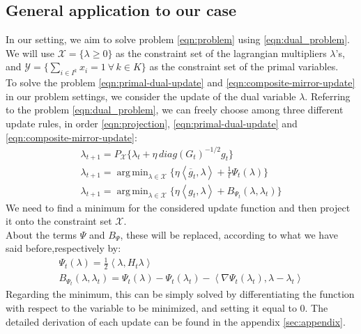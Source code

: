 \documentclass[notitlepage]{article}
\DeclareMathOperator*{\argmin}{arg\,min}
\begin{document}
\subsection{General application to our case}
In our setting, we aim to solve problem \eqref{eqn:problem} using \eqref{eqn:dual_problem}. We will use $\mathcal{X} = \{ \lambda \ge 0 \}$ as the constraint set of the lagrangian multipliers $\lambda$'s, and $\mathcal{Y} = \{ \sum_{i \in I^k} x_i = 1 \ \forall \, k \in K\}$ 
as the constraint set of the primal variables.\\
To solve the problem \eqref{eqn:primal-dual-update} and \eqref{eqn:composite-mirror-update} in our problem settings, we consider the update of the dual variable $\lambda$. Referring to the problem \eqref{eqn:dual_problem}, we can freely choose  
among three different update rules, in order \eqref{eqn:projection}, \eqref{eqn:primal-dual-update} and \eqref{eqn:composite-mirror-update}:
\begin{equation}
  \begin{gathered}
    \lambda_{t+1} = P_{\mathcal{X}} \{ \lambda_t + \eta\, diag(G_t)^{-1/2} g_t \} \\
    \lambda_{t+1} = \argmin_{\lambda \in \mathcal{X}} \{ \eta \left\langle \overline{g}_t,\lambda \right\rangle + \frac{1}{t} \Psi_t(\lambda) \} \\
    \lambda_{t+1} = \argmin_{\lambda \in \mathcal{X}} \{ \eta \left\langle g_t,\lambda \right\rangle + B_{\Psi_t} (\lambda,\lambda_t) \}
    \label{eqn:updates}  
  \end{gathered}
\end{equation}
We need to find a minimum for the considered update function and then project it onto the constraint set $\mathcal{X}$.\\
About the terms $\Psi$ and $B_\Psi$, these will be replaced, according to what we have said before,respectively by:
\begin{gather*}
  \Psi_t(\lambda) = \frac{1}{2} \left\langle \lambda,H_t \lambda \right\rangle \\
  B_{\Psi_t} (\lambda,\lambda_t) = \Psi_t(\lambda) - \Psi_t(\lambda_t) - \left\langle \nabla \Psi_t(\lambda_t),\lambda-\lambda_t \right\rangle
\end{gather*}
Regarding the minimum, this can be simply solved by differentiating the function with respect to the variable to be minimized, and setting it equal to $0$. The detailed derivation of each update can be found in the appendix \ref{sec:appendix}.
\end{document}
